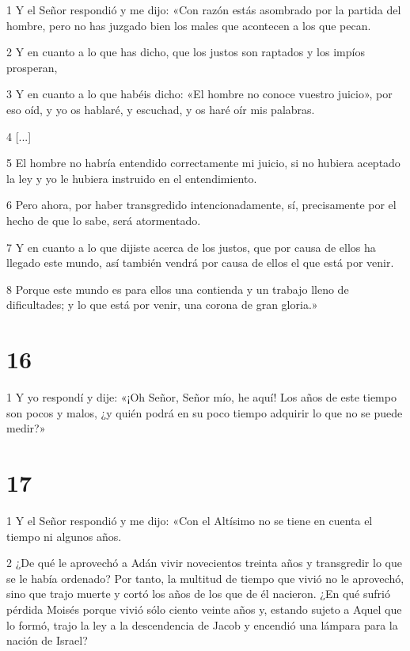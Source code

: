 \par 1 Y el Señor respondió y me dijo: «Con razón estás asombrado por la partida del hombre, pero no has juzgado bien los males que acontecen a los que pecan.

\par 2 Y en cuanto a lo que has dicho, que los justos son raptados y los impíos prosperan,

\par 3 Y en cuanto a lo que habéis dicho: «El hombre no conoce vuestro juicio», por eso oíd, y yo os hablaré, y escuchad, y os haré oír mis palabras.

\par 4 [...]

\par 5 El hombre no habría entendido correctamente mi juicio, si no hubiera aceptado la ley y yo le hubiera instruido en el entendimiento.

\par 6 Pero ahora, por haber transgredido intencionadamente, sí, precisamente por el hecho de que lo sabe, será atormentado.

\par 7 Y en cuanto a lo que dijiste acerca de los justos, que por causa de ellos ha llegado este mundo, así también vendrá por causa de ellos el que está por venir.

\par 8 Porque este mundo es para ellos una contienda y un trabajo lleno de dificultades; y lo que está por venir, una corona de gran gloria.»

\chapter{16}

\par 1 Y yo respondí y dije: «¡Oh Señor, Señor mío, he aquí! Los años de este tiempo son pocos y malos, ¿y quién podrá en su poco tiempo adquirir lo que no se puede medir?»

\chapter{17}

\par 1 Y el Señor respondió y me dijo: «Con el Altísimo no se tiene en cuenta el tiempo ni algunos años.

\par 2 ¿De qué le aprovechó a Adán vivir novecientos treinta años y transgredir lo que se le había ordenado? Por tanto, la multitud de tiempo que vivió no le aprovechó, sino que trajo muerte y cortó los años de los que de él nacieron. ¿En qué sufrió pérdida Moisés porque vivió sólo ciento veinte años y, estando sujeto a Aquel que lo formó, trajo la ley a la descendencia de Jacob y encendió una lámpara para la nación de Israel?

